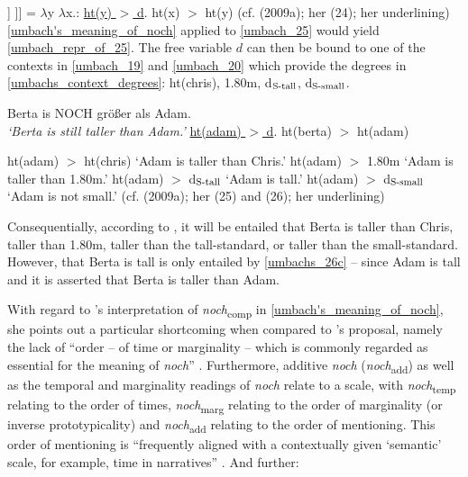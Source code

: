 \documentclass[output=paper,
modfonts
]{langscibook}
\begin{document}
\ea\relax [[ [$_{\textnormal{\footnotesize{AP}}}$ \textit{noch} [$_{\textnormal{\footnotesize{AP}}}$ \textit{größer} ]] ]] = $\lambda$y $\lambda$x.: \underline{ht(y) $>$ d}. ht(x) $>$ ht(y) \label{umbach's_meaning_of_noch} \flushright (cf. \citeauthor{umbach2009a_comp} (2009a); her (24); her underlining)\z
\ref{umbach's_meaning_of_noch} applied to \ref{umbach_25} would yield \ref{umbach_repr_of_25}. The free variable $d$ can then be bound to one of the contexts in \ref{umbach_19} and \ref{umbach_20} which provide the degrees in \ref{umbachs_context_degrees}: ht(chris), 1.80m, d$_{\textnormal{\scriptsize{S-tall}}}$, d$_{\textnormal{\scriptsize{S-small}}}$.

\ea\ea\label{umbach_25} Berta is NOCH größer als Adam. \\ \textit{`Berta is still taller than Adam.'} \vspace{12pt}
\ex    \label{umbach_repr_of_25} \underline{ht(adam) $>$ d}. ht(berta) $>$ ht(adam)  \vspace{12pt}
\z\z

\ea \label{umbachs_context_degrees} \ea ht(adam) $>$ ht(chris) \hspace{22.5pt} `Adam is taller than Chris.'\label{umbach_26a}
\ex ht(adam) $>$ 1.80m          \hspace{33.5pt} `Adam is taller than 1.80m.'
\ex ht(adam) $>$ d$_{\textnormal{\scriptsize{S-tall}}}$   \hspace{35pt} `Adam is tall.' \label{umbach_26c}
\ex ht(adam) $>$ d$_{\textnormal{\scriptsize{S-small}}}$  \hspace{28.5pt} `Adam is not small.' \flushright (cf. \citeauthor{umbach2009a_comp} (2009a); her (25) and (26); her underlining)
  \z\z

\noindent Consequentially, according to \citeauthor{umbach2009a_comp}, it will be entailed that Berta is taller than Chris, taller than 1.80m, taller than the tall-standard, or taller than the small-standard. However, that Berta is tall is only entailed by \ref{umbachs_26c} -- since Adam is tall and it is asserted that Berta is taller than Adam.

With regard to \citeauthor{umbach2009a_comp}'s interpretation of \textit{noch}\textsubscript{comp} in \ref{umbach's_meaning_of_noch}, she points out a particular shortcoming when compared to \citeauthor{koenig1977}'s \citeyearpar{koenig1977} proposal, namely the lack of ``order -- of time or marginality -- which is commonly regarded as essential for the meaning of \textit{noch}'' \citep[p.12]{umbach2009a_comp}. Furthermore, additive \textit{noch} (\textit{noch}\textsubscript{add}) as well as the temporal and marginality readings of \textit{noch} relate to a scale, with \textit{noch}\textsubscript{temp} relating to the order of times, \textit{noch}\textsubscript{marg} relating to the order of marginality (or inverse prototypicality) and \textit{noch}\textsubscript{add} relating to the order of mentioning. This order of mentioning is ``frequently aligned with a contextually given `semantic' scale, for example, time in narratives'' \citep[p.12]{umbach2009a_comp}. And further:
\end{document}

